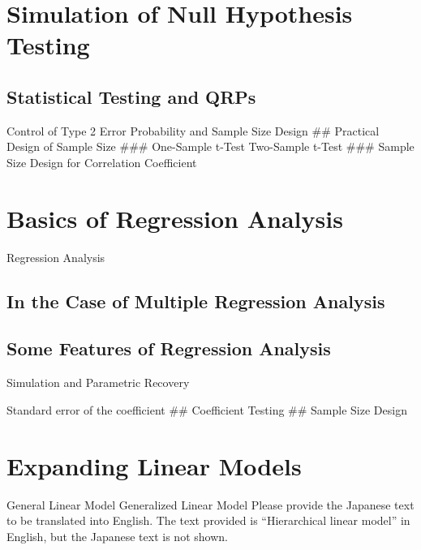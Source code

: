 \documentclass[
  a4paper,
]{book}
\begin{document}

\chapter{Simulation of Null Hypothesis
Testing}\label{simulation-of-null-hypothesis-testing}

\section{Statistical Testing and
QRPs}\label{statistical-testing-and-qrps}

Control of Type 2 Error Probability and Sample Size Design \#\#
Practical Design of Sample Size \#\#\# One-Sample t-Test Two-Sample
t-Test \#\#\# Sample Size Design for Correlation Coefficient


\chapter{Basics of Regression
Analysis}\label{basics-of-regression-analysis}

Regression Analysis

\section{In the Case of Multiple Regression
Analysis}\label{in-the-case-of-multiple-regression-analysis}

\section{Some Features of Regression
Analysis}\label{some-features-of-regression-analysis}

Simulation and Parametric Recovery

Standard error of the coefficient \#\# Coefficient Testing \#\# Sample
Size Design


\chapter{Expanding Linear Models}\label{expanding-linear-models}

General Linear Model Generalized Linear Model Please provide the
Japanese text to be translated into English. The text provided is
``Hierarchical linear model'' in English, but the Japanese text is not
shown.
\end{document}
